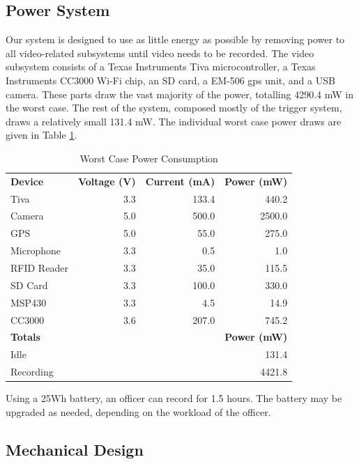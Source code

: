 \documentclass[12pt]{article}
\begin{document}
\subsection{Power System}
Our system is designed to use as little energy as possible by removing power to
all video-related subsystems until video needs to be recorded. The video
subsystem consists of a Texas Instruments Tiva
microcontroller\cite[p.~1880]{tm4c1294ncpdt}, a Texas Instruments CC3000 Wi-Fi
chip\cite[p.~6]{cc3000}, an SD card\cite[p.~19,23]{sd_standard}, a EM-506 \gls{gps}
unit\cite[p.~10]{em506}, and a USB camera\cite[p.~245]{usb_standard}. These
parts draw the vast majority of the power, totalling 4290.4 mW in the worst case.
The rest of the system, composed mostly of the trigger system, draws a relatively small 131.4 mW. The individual worst
case power draws are given in Table \ref{tab:worst_case_power}.

\begin{table}[h!]
    \centering
    \caption{Worst Case Power Consumption}
    \vspace{1.0em}
    \begin{tabular}{lrrr}
        \textbf{Device} & \textbf{Voltage (V)} & \textbf{Current (mA)} & \textbf{Power (mW)}\\
        Tiva & 3.3 & 133.4 & 440.2\\
        Camera & 5.0 & 500.0 & 2500.0\\
        GPS & 5.0 & 55.0 & 275.0\\
        Microphone & 3.3 & 0.5 & 1.0\\
        RFID Reader & 3.3 & 35.0 & 115.5\\
        SD Card & 3.3 & 100.0 & 330.0\\
        MSP430 & 3.3 & 4.5 & 14.9\\
        CC3000 & 3.6 & 207.0 & 745.2\\
        \hline
        \textbf{Totals} & & & \textbf{Power (mW)}\\
        Idle & & & 131.4\\
        Recording & & & 4421.8\\
    \end{tabular}
    \label{tab:worst_case_power}
\end{table}

Using a 25Wh battery, an officer can record for 1.5 hours. The battery may be
upgraded as needed, depending on the workload of the officer.

\subsection{Mechanical Design}
\end{document}
